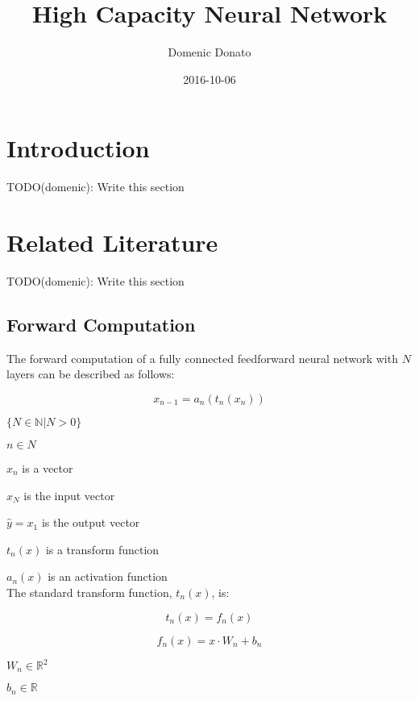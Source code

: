 \documentclass{article}
\title{High Capacity Neural Network}
\date{2016-10-06}
\author{Domenic Donato}
\begin{document}
\maketitle
\newpage
{} 

\section{Introduction}

TODO(domenic): Write this section

\section{Related Literature}

TODO(domenic): Write this section

\subsection{Forward Computation}

The forward computation of a fully connected feedforward neural network with $N$ layers can be described as follows:

\begin{equation}
x_{n-1} = a_n(t_n(x_n))
\end{equation}

$\{N \in \mathbb{N} | N > 0\}$

${n \in N}$

$x_n$ is a vector

$x_N$ is the input vector

$\hat{y} = x_1$ is the output vector

$t_n(x)$ is a transform function

$a_n(x)$ is an activation function\\

The standard transform function, $t_n(x)$, is:

\begin{equation} \label{eq:standard_transform}
t_n(x) = f_n(x)
\end{equation}

\begin{equation} \label{eq:f}
f_n(x) = x \cdot W_n + b_n
\end{equation}

$W_n \in \mathbb{R}^2$

$b_n \in \mathbb{R}$\\
\end{document}
